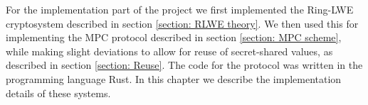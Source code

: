 \documentclass[../main.tex]{subfiles}
\begin{document}
\noindent For the implementation part of the project we first implemented the Ring-LWE cryptosystem described in section \ref{section: RLWE theory}. We then used this for implementing the MPC protocol described in section \ref{section: MPC scheme}, while making slight deviations to allow for reuse of secret-shared values, as described in section \ref{section: Reuse}. The code for the protocol was written in the programming language Rust.
In this chapter we describe the implementation details of these systems.
\end{document}
